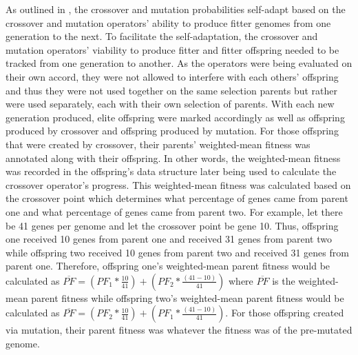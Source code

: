As outlined in \cite{self_adapt}, the crossover and mutation probabilities self-adapt based on the crossover and mutation operators' ability to produce fitter genomes from one generation to the next. To facilitate the self-adaptation, the crossover and mutation operators' viability to produce fitter and fitter offspring needed to be tracked from one generation to another. As the operators were being evaluated on their own accord, they were not allowed to interfere with each others' offspring and thus they were not used together on the same selection parents but rather were used separately, each with their own selection of parents. With each new generation produced, elite offspring were marked accordingly as well as offspring produced by crossover and offspring produced by mutation. For those offspring that were created by crossover, their parents' weighted-mean fitness was annotated along with their offspring. In other words, the weighted-mean fitness was recorded in the offspring's data structure later being used to calculate the crossover operator's progress. This weighted-mean fitness was calculated based on the crossover point which determines what percentage of genes came from parent one and what percentage of genes came from parent two. For example, let there be 41 genes per genome and let the crossover point be gene 10. Thus, offspring one received 10 genes from parent one and received 31 genes from parent two while offspring two received 10 genes from parent two and received 31 genes from parent one. Therefore, offspring one's weighted-mean parent fitness would be calculated as $\overline{PF} = \left ( PF_1 * \frac{10}{41} \right ) + \left (PF_2 * \frac{(41-10)}{41} \right)$ where $\overline{PF}$ is the weighted-mean parent fitness while offspring two's weighted-mean parent fitness would be calculated as $\overline{PF} = \left ( PF_2 * \frac{10}{41} \right ) + \left (PF_1 * \frac{(41-10)}{41} \right)$. For those offspring created via mutation, their parent fitness was whatever the fitness was of the pre-mutated genome. 

